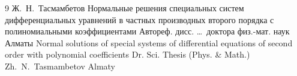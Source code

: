 \begin{thebibliography}{9}
\by Ж.~Н.~Тасмамбетов
\thesis Нормальные решения специальных систем дифференциальных уравнений в частных производных второго порядка с полиномиальными коэффициентами 
\thesisinfo Автореф. дисс. \dots\ доктора физ.-мат. наук
\publaddr Алматы
\misctransl
\thesis Normal solutions of special systems of differential equations of second order  with polynomial coefficients
\thesisinfo Dr. Sci. Thesis (Phys. \& Math.)
\by Zh.~N.~Tasmambetov  \pagebreak
\publaddr Almaty

\end{thebibliography}

\noindent
\hskip6.5cm \thedate \par\noindent
\hskip6.5cm\therevdate


\makeengtitlem


\newpage

%
